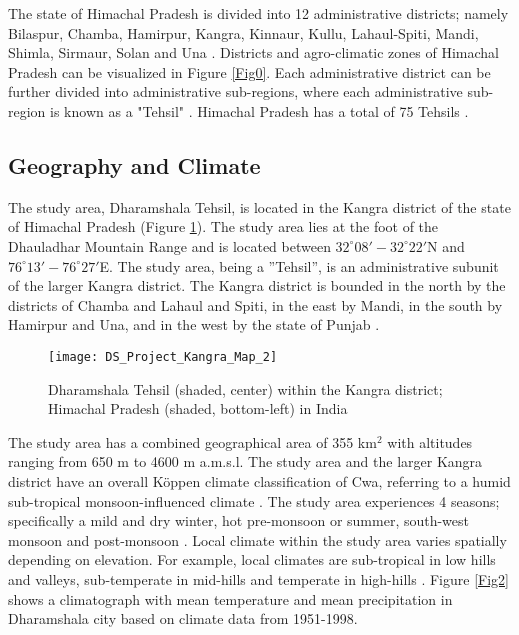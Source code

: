 \justify 
The state of Himachal Pradesh is divided into 12 administrative districts; namely Bilaspur, Chamba, Hamirpur, Kangra, Kinnaur, Kullu, Lahaul-Spiti, Mandi, Shimla, Sirmaur, Solan and Una . Districts and agro-climatic zones of Himachal Pradesh can be visualized in Figure \ref{Fig0}. Each administrative district can be further divided into administrative sub-regions, where each administrative sub-region is known as a "Tehsil" . Himachal Pradesh has a total of 75 Tehsils .

\subsection{Geography and Climate}

\justify
The study area, Dharamshala Tehsil, is located in the Kangra district of the state of Himachal Pradesh (Figure \ref{Fig1}). The study area lies at the foot of the Dhauladhar Mountain Range and is located between $32^\circ 08'-32^\circ 22'$N and $76^\circ13' - 76^\circ27'$E. The study area, being a ''Tehsil'', is an administrative subunit of the larger Kangra district. The Kangra district is bounded in the north by the districts of Chamba and Lahaul and Spiti, in the east by Mandi, in the south by Hamirpur and Una, and in the west by the state of Punjab .

\begin{figure}[H]
\texttt{[image: DS\_Project\_Kangra\_Map\_2]}
\centering
\caption{Dharamshala Tehsil (shaded, center) within the Kangra district; Himachal Pradesh (shaded, bottom-left) in India}\label{Fig1}
\end{figure}
\vspace{-12pt}

\justify
The study area has a combined geographical area of 355 km$^2$ with altitudes ranging from 650 m to 4600 m a.m.s.l. The study area and the larger Kangra district have an overall K{\"o}ppen climate classification of Cwa, referring to a humid sub-tropical monsoon-influenced climate . The study area experiences 4 seasons; specifically a mild and dry winter, hot pre-monsoon or summer, south-west monsoon and post-monsoon . Local climate within the study area varies spatially depending on elevation. For example, local climates are sub-tropical in low hills and valleys, sub-temperate in mid-hills and temperate in high-hills . Figure \ref{Fig2} shows a climatograph with mean temperature and mean precipitation in Dharamshala city based on climate data from 1951-1998.

